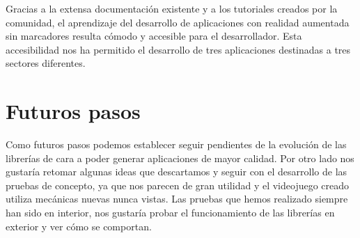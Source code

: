 Gracias a la extensa documentación existente y a los tutoriales creados por la comunidad, el aprendizaje del desarrollo de aplicaciones con realidad aumentada sin marcadores resulta cómodo y accesible para el desarrollador. Esta accesibilidad nos ha permitido el desarrollo de tres aplicaciones destinadas a tres sectores diferentes.


\section*{Futuros pasos}

Como futuros pasos podemos establecer seguir pendientes de la evolución de las librerías de cara a poder generar aplicaciones de mayor calidad. Por otro lado nos gustaría retomar algunas ideas que descartamos y seguir con el desarrollo de las pruebas de concepto, ya que nos parecen de gran utilidad y el videojuego creado utiliza mecánicas nuevas nunca vistas. Las pruebas que hemos realizado siempre han sido en interior, nos gustaría probar el funcionamiento de las librerías en exterior y ver cómo se comportan.

\noindent 
